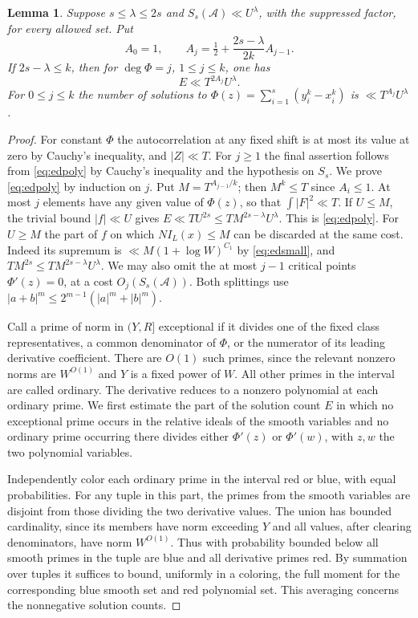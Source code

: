\documentclass[11pt,letterpaper]{article}
\newtheorem{lemma}[lemma]{Lemma}
\theoremstyle{definition}
\numberwithin{equation}{section}
\begin{document}
\begin{lemma}\label{lem:edpoly}
Suppose $s\le\lambda\le2s$ and $S_s(\mathcal A)\ll U^\lambda$, with the
suppressed factor, for every allowed set. Put
\[
 A_0=1,\qquad A_j=\tfrac12+\frac{2s-\lambda}{2k}A_{j-1}.
\]
If $2s-\lambda\le k$, then for $\deg\Phi=j$, $1\le j\le k$, one has
\begin{equation}\label{eq:edpoly}
 E\ll T^{2A_j}U^\lambda .
\end{equation}
For $0\le j\le k$ the number of solutions to
$\Phi(z)=\sum_{i=1}^s(y_i^k-x_i^k)$ is
$\ll T^{A_j}U^\lambda$.
\end{lemma}

\begin{proof}
For constant $\Phi$ the autocorrelation at any fixed shift is at most
its value at zero by Cauchy's inequality, and $|Z|\ll T$. For $j\ge1$
the final assertion follows from \eqref{eq:edpoly} by Cauchy's inequality
and the hypothesis on $S_s$. We prove \eqref{eq:edpoly} by induction
on $j$. Put $M=T^{A_{j-1}/k}$; then $M^k\le T$ since $A_i\le1$.
At most $j$ elements have any given value of $\Phi(z)$, so that
$\int |F|^2\ll T$. If $U\le M$, the trivial bound $|f|\ll U$ gives
$E\ll TU^{2s}\le T M^{2s-\lambda}U^\lambda$. This is
\eqref{eq:edpoly}. For $U\ge M$ the part of $f$ on which
$NI_L(x)\le M$ can be discarded at the same cost. Indeed its supremum
is $\ll M(1+\log W)^{C_1}$ by \eqref{eq:edsmall}, and
$TM^{2s}\le T M^{2s-\lambda}U^\lambda$.
We may also omit the at most $j-1$ critical points $\Phi'(z)=0$, at a
cost $O_j(S_s(\mathcal A))$. Both splittings use
$|a+b|^m\le2^{m-1}(|a|^m+|b|^m)$.

Call a prime of norm in $(Y,R]$ exceptional if it divides one of the
fixed class representatives, a common denominator of $\Phi$, or the
numerator of its leading derivative coefficient. There are $O(1)$ such
primes, since the relevant nonzero norms are $W^{O(1)}$ and $Y$ is a
fixed power of $W$. All other primes in the interval are called ordinary.
The derivative reduces to a nonzero polynomial at each ordinary prime.
We first estimate the part of the solution count $E$ in which no
exceptional prime occurs in the relative ideals of the smooth variables
and no ordinary prime occurring there divides either $\Phi'(z)$ or
$\Phi'(w)$, with $z,w$ the two polynomial variables.

Independently color each ordinary prime in the interval red or blue,
with equal probabilities. For any tuple in this part, the primes from
the smooth variables are disjoint from those dividing the two derivative
values. The union has bounded cardinality, since its members have norm
exceeding $Y$ and all values, after clearing denominators, have norm
$W^{O(1)}$. Thus with probability bounded below all smooth primes in
the tuple are blue and all derivative primes red. By summation over
tuples it suffices to bound, uniformly in a coloring, the full moment
for the corresponding blue smooth set and red polynomial set. This
averaging concerns the nonnegative solution counts.


\end{proof}
\end{document}
